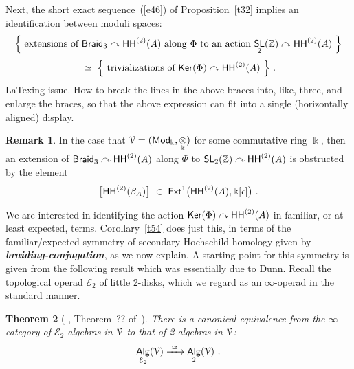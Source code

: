 \documentclass{amsart}
\newtheorem{theorem}{Theorem}[section]
\theoremstyle{definition}
\newtheorem{remark}[theorem]{Remark}
\theoremstyle{remark}
\DeclareMathOperator{\Alg}{\sf Alg}
\DeclareMathOperator{\Mod}{\sf Mod}
\DeclareMathOperator{\Ker}{\sf Ker}
\newcommand{\bit}[1]{\textbf{\textit{#1}}}
\newcommand{\lacts}{\curvearrowright}
\def\ot{\otimes}
\newcommand{\xra}{\xrightarrow}
\def\cE{\mathcal E}\def\cF{\mathcal F}\def\cG{\mathcal G}\def\cH{\mathcal H}
\DeclareMathOperator{\Braid}{{\sf Braid}_3}
\DeclareMathOperator{\SL}{\sf SL}
\DeclareMathOperator{\sHH}{\sf HH}
\DeclareMathOperator{\HHt}{{\sf HH}^{(2)}}
\begin{document}
%





















Next, the short exact sequence~(\ref{e46}) of Proposition~\ref{t32} implies an identification between moduli spaces:
\[
\Bigl\{
\text{ extensions of $\Braid\lacts \HHt(A)$ along $\Phi$ to an action $\SL_2(\ZZ)\lacts \HHt(A)$ }
\Bigr\}
\]
\[
~\simeq~
\Bigl\{
\text{ trivializations of $\Ker(\Phi) \lacts \HHt(A)$ }
\Bigr\}
~.
\]
{\color{red}
LaTexing issue.
How to break the lines in the above braces into, like, three, and enlarge the braces, so that the above expression can fit into a single (horizontally aligned) display.
}

{\color{magenta}
\begin{remark}
In the case that $\cV = ( \Mod_{\Bbbk} , \underset{\Bbbk} \ot )$ for some commutative ring $\Bbbk$, 
then an extension of $\Braid \lacts \HHt(A)$ along $\Phi$ to $\SL_2(\ZZ) \lacts \HHt(A)$ is obstructed by the element
\[
\bigl[
\HHt(\beta_A)
\bigr]
~\in~
{\sf Ext}^1\bigl( \HHt(A) , \Bbbk[\epsilon] \bigr)
~.
\]

\end{remark}
}


We are interested in identifying the action $\Ker(\Phi)\lacts \HHt(A)$ in familiar, or at least expected, terms.
Corollary~\ref{t54} does just this, in terms of the familiar/expected symmetry of secondary Hochschild homology given by \bit{braiding-conjugation}, as we now explain.  
A starting point for this symmetry is given from the following result which was essentially due to Dunn.
Recall the topological operad $\cE_2$ of little 2-disks, which we regard as an $\infty$-operad in the standard manner.  
\begin{theorem}[{\color{red} \cite{dunn??}, Theorem~?? of~\cite{HA}}]
\label{t52}
There is a canonical equivalence from the $\infty$-category of $\cE_2$-algebras in $\mathcal V$ to that of 2-algebras in $\mathcal V$:
\[
\Alg_{\cE_2}(\cV)
\xra{~\simeq~}
\Alg_2(\cV)
~.
\]

\end{theorem}
\end{document}
